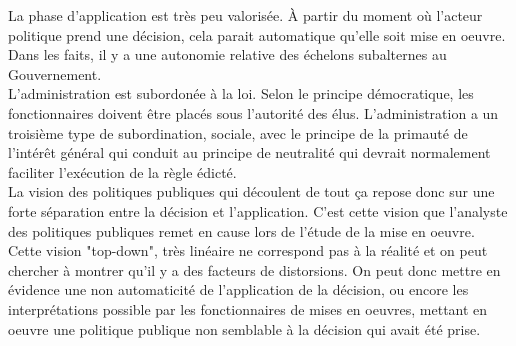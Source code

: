 \documentclass[10pt, a4paper, openany]{book}
\begin{document}
La phase d'application est très peu valorisée. À partir du moment où l'acteur politique prend une décision, cela parait automatique qu'elle soit mise en oeuvre. Dans les faits, il y a une autonomie relative des échelons subalternes au Gouvernement. \\
L'administration est subordonée à la loi. Selon le principe démocratique, les fonctionnaires doivent être placés sous l'autorité des élus. L'administration a un troisième type de subordination, sociale, avec le principe de la primauté de l'intérêt général qui conduit au principe de neutralité qui devrait normalement faciliter l'exécution de la règle édicté. \\
La vision des politiques publiques qui découlent de tout ça repose donc sur une forte séparation entre la décision et l'application. C'est cette vision que l'analyste des politiques publiques remet en cause lors de l'étude de la mise en oeuvre. \\
Cette vision "top-down", très linéaire ne correspond pas à la réalité et on peut chercher à montrer qu'il y a des facteurs de distorsions. On peut donc mettre en évidence une non automaticité de l'application de la décision, ou encore les interprétations possible par les fonctionnaires de mises en oeuvres, mettant en oeuvre une politique publique non semblable à la décision qui avait été prise.
\end{document}
